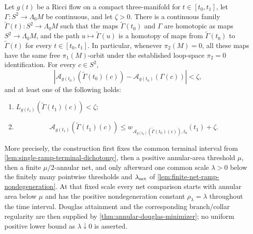 \begin{theorem}
\label{thm:controlled-loop-family-deformation}
\notready
Let $g(t)$ be a Ricci flow on a compact three-manifold for
$t\in[t_0,t_1]$, let $\Gamma\colon S^2\to\Lambda_0M$ be continuous, and let
$\zeta>0$.  There is a continuous family
$\widetilde\Gamma(t)\colon S^2\to\Lambda_0M$ such that
the maps $\widetilde\Gamma(t_0)$ and $\Gamma$ are homotopic as maps
$S^2\to\Lambda_0M$, and the path $u\mapsto\widetilde\Gamma(u)$ is a homotopy
of maps from $\widetilde\Gamma(t_0)$ to $\widetilde\Gamma(t)$ for every
$t\in[t_0,t_1]$.  In particular, whenever $\pi_2(M)=0$, all these maps have
the same free $\pi_1(M)$-orbit under the established loop-space
$\pi_2=0$ identification.  For every $c\in S^2$,
\[
 |\mathcal A_{g(t_0)}(\widetilde\Gamma(t_0)(c))
   -\mathcal A_{g(t_0)}(\Gamma(c))|<\zeta,
\]
and at least one of the following holds:
\begin{enumerate}
\item $L_{g(t_1)}(\widetilde\Gamma(t_1)(c))<\zeta$;
\item
\[
 \mathcal A_{g(t_1)}(\widetilde\Gamma(t_1)(c))
 \le w_{\mathcal A_{g(t_0)}(\widetilde\Gamma(t_0)(c)),t_0}(t_1)+\zeta.
\]
\end{enumerate}
More precisely, the construction first fixes the common terminal interval
from \ref{lem:single-ramp-terminal-dichotomy}, then a positive annular-area
threshold $\mu$, then a finite $\mu/2$-annular net, and only afterward one
common scale $\lambda>0$ below the finitely many pointwise thresholds and
$\lambda_{\rm net}$ of
\ref{lem:finite-net-ramp-nondegeneration}.  At that fixed scale every net
comparison starts with annular area below $\mu$ and has the positive
nondegeneration constant $\rho_\lambda=\lambda$ throughout the time
interval.  Douglas attainment and the corresponding branch/collar
regularity are then supplied by
\ref{thm:annular-douglas-minimizer}; no uniform positive lower bound as
$\lambda\downarrow0$ is asserted.
\end{theorem}

